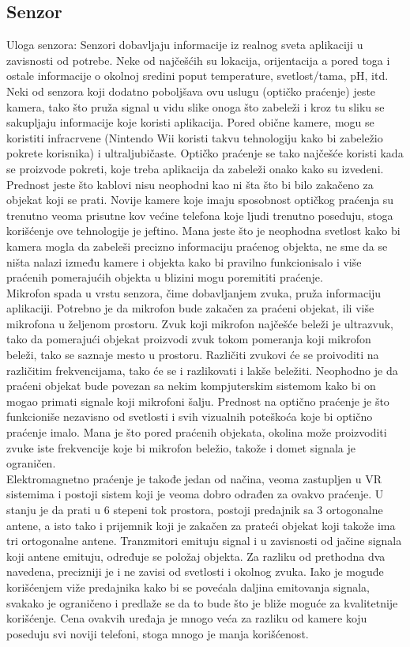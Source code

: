 \documentclass[a4paper]{article}
\begin{document}
	\subsection{Senzor}
    \label{sec:Senzor}
    Uloga senzora: Senzori dobavljaju informacije iz realnog sveta aplikaciji u zavisnosti od potrebe. Neke od najčešćih su lokacija, orijentacija a pored toga i ostale informacije o okolnoj sredini poput temperature, svetlost/tama, pH, itd.\\
	Neki od senzora koji dodatno poboljšava ovu uslugu (optičko praćenje) jeste kamera, tako što pruža signal u vidu slike onoga što zabeleži i kroz tu sliku se sakupljaju informacije koje koristi aplikacija. Pored obične kamere, mogu se koristiti infracrvene (Nintendo Wii koristi takvu tehnologiju kako bi zabeležio pokrete korisnika)  i ultraljubičaste. Optičko praćenje se tako najčešće koristi kada se proizvode pokreti, koje treba aplikacija da zabeleži onako kako su izvedeni. Prednost jeste što kablovi nisu neophodni kao ni šta što bi bilo zakačeno za objekat koji se prati.  Novije kamere koje imaju sposobnost optičkog praćenja su trenutno veoma prisutne kov većine telefona koje ljudi trenutno poseduju, stoga korišćenje ove tehnologije je jeftino. Mana jeste što je neophodna svetlost kako bi kamera mogla da zabeleši precizno informaciju praćenog objekta, ne sme da se ništa nalazi između kamere i objekta kako bi pravilno funkcionisalo i više praćenih pomerajućih objekta u blizini mogu poremititi praćenje.\\
	Mikrofon spada u vrstu senzora, čime dobavljanjem zvuka, pruža informaciju aplikaciji. Potrebno je da mikrofon bude zakačen za praćeni objekat, ili više mikrofona u željenom prostoru. Zvuk koji mikrofon najčešće beleži je ultrazvuk, tako da pomerajući objekat proizvodi zvuk tokom pomeranja koji mikrofon beleži, tako se saznaje mesto u prostoru. Različiti zvukovi će se proivoditi na različitim frekvencijama, tako će se i razlikovati i lakše beležiti. Neophodno je da praćeni objekat bude povezan sa nekim kompjuterskim sistemom kako bi on mogao primati signale koji mikrofoni šalju. Prednost na optično praćenje je što funkcioniše nezavisno od svetlosti i svih vizualnih poteškoća koje bi optično praćenje imalo. Mana je što pored praćenih objekata, okolina može proizvoditi zvuke iste frekvencije koje bi mikrofon beležio,  takože i domet signala je ograničen.\\
	Elektromagnetno praćenje je takođe jedan od načina, veoma zastupljen u VR sistemima i postoji sistem koji je veoma dobro odrađen za ovakvo praćenje. U stanju je da prati u 6 stepeni tok prostora, postoji predajnik sa 3 ortogonalne antene, a isto tako i prijemnik koji je zakačen za prateći objekat koji takože ima tri ortogonalne antene. Tranzmitori emituju signal i u zavisnosti od jačine signala koji antene emituju, određuje se položaj objekta. Za razliku od prethodna dva navedena, precizniji je i ne zavisi od svetlosti i okolnog zvuka. Iako je moguđe korišćenjem viže predajnika kako bi se povećala daljina emitovanja signala, svakako je ograničeno i predlaže se da to bude što je bliže moguće za kvalitetnije korišćenje. Cena ovakvih uređaja je mnogo veća za razliku od kamere koju poseduju svi noviji telefoni, stoga mnogo je manja korišćenost.\\
\end{document}
